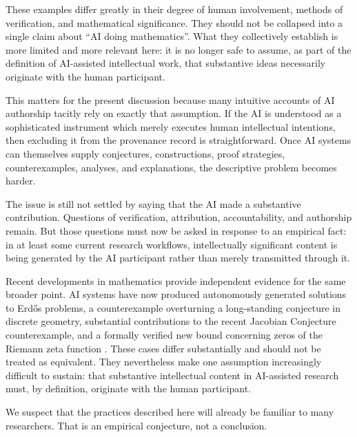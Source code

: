 These examples differ greatly in their degree of human involvement, methods of verification, and mathematical significance. They should not be collapsed into a single claim about ``AI doing mathematics''. What they collectively establish is more limited and more relevant here: it is no longer safe to assume, as part of the definition of AI-assisted intellectual work, that substantive ideas necessarily originate with the human participant.

This matters for the present discussion because many intuitive accounts of AI authorship tacitly rely on exactly that assumption. If the AI is understood as a sophisticated instrument which merely executes human intellectual intentions, then excluding it from the provenance record is straightforward. Once AI systems can themselves supply conjectures, constructions, proof strategies, counterexamples, analyses, and explanations, the descriptive problem becomes harder.

The issue is still not settled by saying that the AI made a substantive contribution. Questions of verification, attribution, accountability, and authorship remain. But those questions must now be asked in response to an empirical fact: in at least some current research workflows, intellectually significant content is being generated by the AI participant rather than merely transmitted through it.



Recent developments in mathematics provide independent evidence for the same broader point. AI systems have now produced autonomously generated solutions to Erd\H{o}s problems, a counterexample overturning a long-standing conjecture in discrete geometry, substantial contributions to the recent Jacobian Conjecture counterexample, and a formally verified new bound concerning zeros of the Riemann zeta function \citep{sothanaphan2026erdos728,alonEtAl2026unitdistance,gao2026jacobian,claude2026zeta}. These cases differ substantially and should not be treated as equivalent. They nevertheless make one assumption increasingly difficult to sustain: that substantive intellectual content in AI-assisted research must, by definition, originate with the human participant.


We suspect that the practices described here will already be familiar to many researchers. That is an empirical conjecture, not a conclusion.

